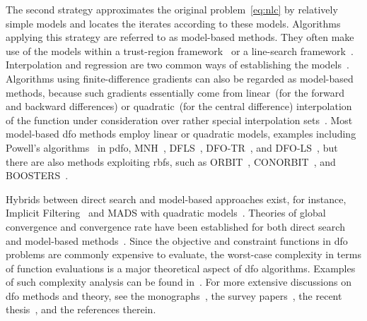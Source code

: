 \documentclass[
    smallextended,  %
    final,          %
]{svjour3}
\begin{document}
The second strategy approximates the original problem~\eqref{eq:nlc} by relatively simple models and locates the iterates according to these models.
Algorithms applying this strategy are referred to as model-based methods.
They often make use of the models within a trust-region framework~\cite{Conn_Scheinberg_Vicente_2009a} or a line-search framework~\cite{Berahas_Byrd_Nocedal_2019}.
Interpolation and regression are two common ways of establishing the models~\cite{Powell_2001,Conn_Scheinberg_Vicente_2008a,Conn_Scheinberg_Vicente_2008b,Wild_Regis_Shoemaker_2008,Bandeira_Scheinberg_Vicente_2012,Billups_Larson_Graf_2013,Regis_Wild_2017}.
Algorithms using finite-difference gradients can also be regarded as model-based methods, because such gradients essentially come from linear~(for the forward and backward differences) or quadratic~(for the central difference) interpolation of the function under consideration over rather special interpolation sets~\cite[\S~1.4.3]{Ragonneau_2022}.
Most model-based \gls{dfo} methods employ linear or quadratic models, examples including Powell's algorithms~\cite{Powell_1994,Powell_2002,Powell_2006,Powell_2009} in \gls{pdfo}, MNH~\cite{Wild_2008}, DFLS~\cite{Zhang_Conn_Scheinberg_2010}, DFO-TR~\cite{Bandeira_Scheinberg_Vicente_2012}, and DFO-LS~\cite{Cartis_Etal_2019,Hough_Roberts_2022}, but there are also methods exploiting \glspl{rbf}, such as ORBIT~\cite{Wild_Regis_Shoemaker_2008}, CONORBIT~\cite{Regis_Wild_2017}, and BOOSTERS~\cite{Oeuvray_Bierlaire_2009}.

Hybrids between direct search and model-based approaches exist, for instance, Implicit Filtering~\cite[Algorithm~4.7]{Kelley_2011} and MADS with quadratic models~\cite{Conn_LeDigabel_2013}.
Theories of global convergence and convergence rate have been established for both direct search~\cite{Torczon_1997,Kolda_Lewis_Torczon_2003,Vicente_2013,Gratton_Etal_2015,Dodangeh_Vicente_2016} and model-based methods~\cite{Conn_Scheinberg_Toint_1997a,Conn_Scheinberg_Vicente_2009a,Powell_2012,Garmanjani_Judice_Vicente_2016}.
Since the objective and constraint functions in \gls{dfo} problems are commonly expensive to evaluate, the worst-case complexity in terms of function evaluations is a major theoretical aspect of \gls{dfo} algorithms.
Examples of such complexity analysis can be found in~\cite{Vicente_2013,Gratton_Etal_2015,Dodangeh_Vicente_2016,Garmanjani_Judice_Vicente_2016}.
For more extensive discussions on \gls{dfo} methods and theory, see the monographs~\cite{Conn_Scheinberg_Vicente_2009b,Audet_Hare_2017}, the survey papers~\cite{Rios_Sahinidis_2013,Custodio_Scheinberg_Vicente_2017,Larson_Menickelly_Wild_2019}, the recent thesis~\cite{Ragonneau_2022}, and the references therein.
\end{document}

